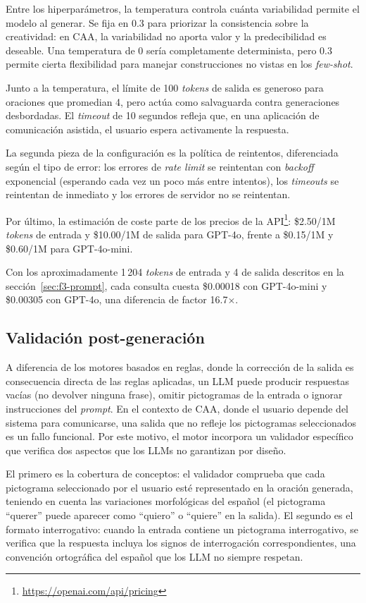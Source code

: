 Entre los hiperparámetros, la temperatura controla cuánta variabilidad permite el modelo al generar. Se fija en 0.3 para priorizar la consistencia sobre la creatividad: en CAA, la variabilidad no aporta valor y la predecibilidad es deseable. Una temperatura de 0 sería completamente determinista, pero 0.3 permite cierta flexibilidad para manejar construcciones no vistas en los \textit{few-shot}.

Junto a la temperatura, el límite de 100 \textit{tokens} de salida es generoso para oraciones que promedian 4, pero actúa como salvaguarda contra generaciones desbordadas. El \textit{timeout} de 10 segundos refleja que, en una aplicación de comunicación asistida, el usuario espera activamente la respuesta.

La segunda pieza de la configuración es la política de reintentos, diferenciada según el tipo de error: los errores de \textit{rate limit} se reintentan con \textit{backoff} exponencial (esperando cada vez un poco más entre intentos), los \textit{timeouts} se reintentan de inmediato y los errores de servidor no se reintentan.

Por último, la estimación de coste parte de los precios de la API\footnote{\url{https://openai.com/api/pricing}}: \$2.50/1M \textit{tokens} de entrada y \$10.00/1M de salida para GPT-4o, frente a \$0.15/1M y \$0.60/1M para GPT-4o-mini.

Con los aproximadamente 1\,204 \textit{tokens} de entrada y 4 de salida descritos en la sección~\ref{sec:f3-prompt}, cada consulta cuesta \$0.00018 con GPT-4o-mini y \$0.00305 con GPT-4o, una diferencia de factor 16.7$\times$.

\subsection{Validación post-generación}
\label{sec:f3-validacion}

A diferencia de los motores basados en reglas, donde la corrección de la salida es consecuencia directa de las reglas aplicadas, un LLM puede producir respuestas vacías (no devolver ninguna frase), omitir pictogramas de la entrada o ignorar instrucciones del \textit{prompt}. En el contexto de CAA, donde el usuario depende del sistema para comunicarse, una salida que no refleje los pictogramas seleccionados es un fallo funcional. Por este motivo, el motor incorpora un validador específico que verifica dos aspectos que los LLMs no garantizan por diseño.

El primero es la cobertura de conceptos: el validador comprueba que cada pictograma seleccionado por el usuario esté representado en la oración generada, teniendo en cuenta las variaciones morfológicas del español (el pictograma ``querer'' puede aparecer como ``quiero'' o ``quiere'' en la salida). El segundo es el formato interrogativo: cuando la entrada contiene un pictograma interrogativo, se verifica que la respuesta incluya los signos de interrogación correspondientes, una convención ortográfica del español que los LLM no siempre respetan.

